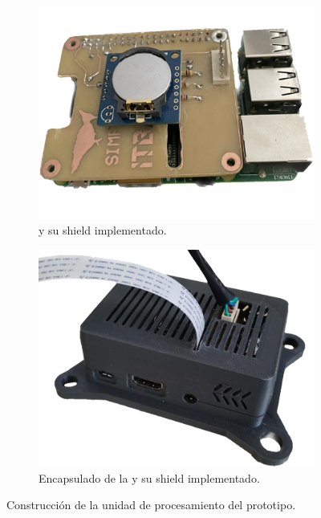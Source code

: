 \begin{figure}[H]
\centering
    	\begin{subfigure}{0.4\textwidth}
        	\centering
        	\includegraphics[width=\linewidth]{ImagenesConstruccion del prototipo/rpiyshield_prototipo}		
			\caption{\rspi y su shield implementado.}
			\label{fig:rpiyshield_prototipo}
        \end{subfigure}\hspace*{2cm}
        \begin{subfigure}{0.4\textwidth}
        	\centering
        	\includegraphics[width=\linewidth]{ImagenesConstruccion del prototipo/rpiyshield_encapsulado_prototipo}
        	\caption{Encapsulado de la \rspi y su shield implementado.}
			\label{fig:casing_rpi}
        \end{subfigure}
	\caption{Construcción de la unidad de procesamiento del prototipo.}
	\label{fig:up_prototipo}
\end{figure}

